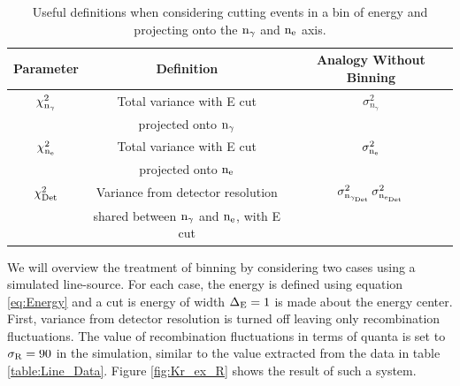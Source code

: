\renewcommand{\baselinestretch}{1}
\small\normalsize
\begin{table}[h!]
\begin{center}
\begin{tabular}{|c|c|c|}
\hline
Parameter & Definition & Analogy Without Binning
 \\ \hline
$\rm \chi_{n_{\gamma}}^2$	& Total variance with E cut	& $\sigma_{n_{\gamma}}^2$ \\ 
							& projected onto $\rm n_\gamma$ & 						\\ \hline					
$\rm \chi_{n_{e}}^2$ & Total variance with E cut	& $\rm \sigma_{n_{e}}^2$	\\
							& projected onto $\rm n_e$ & 						\\ \hline
$\rm \chi_{Det}^2$			& Variance from detector resolution & $\rm \sigma_{n_{\gamma_{Det}}}^2 \, \sigma_{n_{e_{Det}}}^2 $ \\
							& shared between $\rm n_\gamma$ and $\rm n_e$, with E cut   & 						\\ \hline
\end{tabular}
\caption{ Useful definitions when considering cutting events in a bin of energy and projecting onto the $\rm n_\gamma$ and $\rm n_e$ axis. }
\label{table:E_Slice}
\end{center}
\end{table}
\renewcommand{\baselinestretch}{2}
\small\normalsize
 
 \newpage

We will overview the treatment of binning by considering two cases using a simulated \KrCal line-source. For each case, the energy is defined using equation \ref {eq:Energy} and a cut is energy of width $\rm \Delta_E=1$ is made about the energy center. First, variance from detector resolution is turned off leaving only recombination fluctuations. The value of recombination fluctuations in terms of quanta is set to $\rm \sigma_R = 90 $ in the simulation, similar to the value extracted from the \KrCal data in table \ref{table:Line_Data}. Figure \ref{fig:Kr_ex_R} shows the result of such a system.

